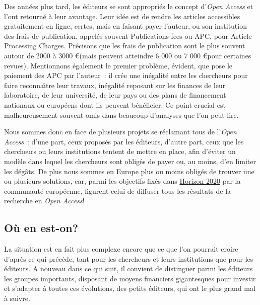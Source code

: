 Des ann{\'e}es plus tard, les {\'e}diteurs se sont appropri{\'e}s le concept d'\emph{Open Access} et l'ont retourn{\'e} {\`a} leur avantage. Leur id{\'e}e est de rendre les articles
accessibles gratuitement en ligne, certes, mais en faisant payer l'auteur, ou son institution des frais de publication, appel{\'e}s souvent Publications
fees ou APC, pour Article Processing Charges. Pr{\'e}cisons que les frais de publication sont le plus souvent autour de 2000 {\`a} 3000 \euro (mais peuvent
atteindre 6 000 ou 7 000 \euro pour certaines revues). Mentionnons {\'e}galement le premier probl{\`e}me, {\'e}vident, que pose le paiement des APC par l'auteur~:
il cr{\'e}e une in{\'e}galit{\'e} entre les chercheurs pour faire reconna{\^\i}tre leur travaux, in{\'e}galit{\'e} reposant sur les finances de leur laboratoire, de leur universit{\'e},
de leur pays ou des plans de financement nationaux ou europ{\'e}ens dont ils peuvent b{\'e}n{\'e}ficier. Ce point crucial est malheureusement souvent omis dans beaucoup
d'analyses que l'on peut lire.

Nous sommes donc en face de plusieurs projets se r{\'e}clamant tous de l'\emph{Open Access}~: d'une part, ceux propos{\'e}s par les {\'e}diteurs, d'autre part, ceux que les
chercheurs ou leurs institutions tentent de mettre en place, afin d'{\'e}viter un mod{\`e}le dans lequel les chercheurs sont oblig{\'e}s de payer ou, au moins,
d'en limiter les d{\'e}g{\^a}ts. De plus nous sommes en Europe plus ou moins oblig{\'e}s de trouver une ou plusieurs solutions, car, parmi les objectifs fix{\'e}s dans
\href{https://ec.europa.eu/research/science-society/document_library/pdf_06/recommendation-access-and-preservation-scientific-information_fr.pdf}{Horizon 2020}
par la communaut{\'e} europ{\'e}enne, figurent celui de diffuser tous les r{\'e}sultats de la recherche en \emph{Open Access}!


\subsection{O{\`u} en est-on?}

La situation est en fait plus complexe encore que ce que l'on pourrait croire d'apr{\`e}s ce qui pr{\'e}c{\`e}de, tant pour les chercheurs et leurs institutions
que pour les {\'e}diteurs. A nouveau dans ce qui suit, il convient de distinguer parmi les {\'e}diteurs les groupes importants, disposant de moyens financiers
gigantesques pour investir et s'adapter {\`a} toutes ces {\'e}volutions, des petits {\'e}diteurs, qui ont le plus grand mal {\`a} suivre.

